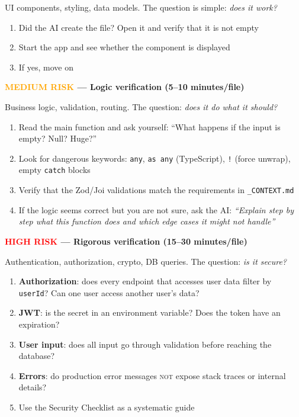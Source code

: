 UI components, styling, data models. The question is simple: \textit{does it work?}

\begin{enumerate}
  \item Did the AI create the file? Open it and verify that it is not empty
  \item Start the app and see whether the component is displayed
  \item If yes, move on
\end{enumerate}

\textbf{\textcolor{orange}{MEDIUM RISK} --- Logic verification (5--10 minutes/file)}

Business logic, validation, routing. The question: \textit{does it do what it should?}

\begin{enumerate}
  \item Read the main function and ask yourself: ``What happens if the input is empty? Null? Huge?''
  \item Look for dangerous keywords: \texttt{any}, \texttt{as any} (TypeScript), \texttt{!} (force unwrap), empty \texttt{catch} blocks
  \item Verify that the Zod/Joi validations match the requirements in \texttt{\_CONTEXT.md}
  \item If the logic seems correct but you are not sure, ask the AI: \textit{``Explain step by step what this function does and which edge cases it might not handle''}
\end{enumerate}

\textbf{\textcolor{red}{HIGH RISK} --- Rigorous verification (15--30 minutes/file)}

Authentication, authorization, crypto, DB queries. The question: \textit{is it secure?}

\begin{enumerate}
  \item \textbf{Authorization}: does every endpoint that accesses user data filter by \texttt{userId}? Can one user access another user's data?
  \item \textbf{JWT}: is the secret in an environment variable? Does the token have an expiration?
  \item \textbf{User input}: does all input go through validation before reaching the database?
  \item \textbf{Errors}: do production error messages \textsc{not} expose stack traces or internal details?
  \item Use the Security Checklist as a systematic guide
\end{enumerate}

